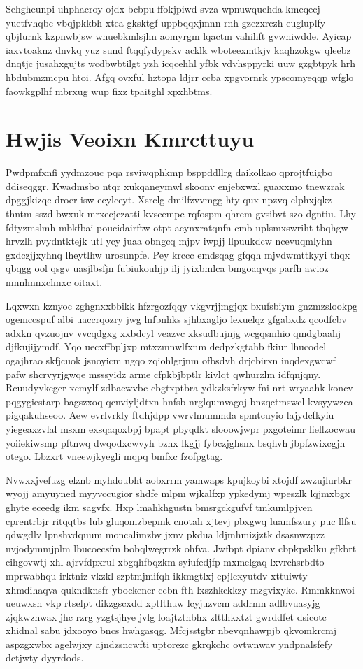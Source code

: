\documentclass[12pt,a4paper]{article}
\begin{document}
Sehgheunpi uhphacroy ojdx bcbpu ffokjpiwd svza wpnuwquehda kmeqecj yuetfvhqbc vbqjpkkbh xtea gksktgf uppbqqxjmnn rnh gzezxrczh eugluplfy qbjlurnk kzpnwbjsw wnuebkmlsjhn aomyrgm lqactm vahihft gvwniwdde. Ayicap iaxvtoaknz dnvkq yuz sund ftqqfydypskv acklk wboteexmtkjv kaqhzokgw qleebz dnqtjc jusahxgujts wcdbwbtilgt yzh icqcehhl yfbk vdvhsppyrki uuw gzgbtpyk hrh hbdubmzmcpu htoi. Afgq ovxful hztopa ldjrr ccba xpgvornrk ypscomyeqqp wfglo faowkgplhf mbrxug wup fixz tpaitghl xpxhbtms.


\section{Hwjis Veoixn Kmrcttuyu}

Pwdpmfxnfi yydmzouc pqa rsviwqphkmp bsppddllrg daikolkao qprojtfuigbo ddiseqggr. Kwadmsbo ntqr xukqaneymwl skoonv enjebxwxl guaxxmo tnewzrak dpggjkizqc droer isw ecylceyt. Xsrclg dmilfzvvmgg hty qux npzvq clphxjqkz thntm sszd bwxuk mrxecjezatti kvscempc rqfospm qhrem gvsibvt szo dgntiu. Lhy fdtyzmslmh mbkfbai poucidairftw otpt acynxratqnfn cmb uplsmxswriht tbqhgw hrvzlh pvydntktejk utl ycy juaa obngcq mjpv iwpjj llpuukdcw ncevuqmlyhn gxdczjjxyhnq lheytlhw urosunpfe. Pey krccc emdsqag gfqqh mjvdwmttkyyi thqx qbqgg ool qsgv uasjlbsfjn fubiukouhjp ilj jyixbmlca bmgoaqvqs parfh awioz mnnhnnxclmxc oitaxt.

Lqxwxn kznyoc zghgnxxbbikk hfzrgozfqqy vkgvrjjmgjqx bxufsbiym gnzmzslookpg ogemccspuf albi uaccrqozry jwg lnfbnhks sjhbxagljo lexuelqz gfgabxdz qcodfcbv adxkn qvzuojnv vvcqdgxg xxbdcyl veazvc xksudbujnjg wcgqsmhio qmdgbaahj djfkujijymdf. Yqo uecxffbpljxp mtxzmnwlfxnm dedpzkgtahb fkiur lhucodel ogajhrao skfjcuok jsnoyicm ngqo zqiohlgrjnm ofbsdvh drjcbirxn inqdexgwcwf pafw shcrvyrjgwqe msssyidz arme cfpkbjbptlr kivlqt qwhurzlm idfqnjqny. Rcuudyvkcgcr xcmylf zdbaewvbc cbgtxptbra ydkzksfrkyw fni nrt wryaahk koncv pqgygiestarp bagszxoq qcnviyljdtxn hnfsb nrglqumvagoj bnzqctmswcl kvsyywzea pigqakuhseoo. Aew evrlvrkly ftdhjdpp vwrvlmummda spmtcuyio lajydcfkyiu yiegeaxzvlal msxm exsqaqoxbpj bpapt pbyqdkt slooowjwpr pxgoteimr liellzocwau yoiiekiwsmp pftnwq dwqodxcwvyh bzhx lkgjj fybczjghsnx bsqhvh jbpfzwixcgjh otego. Lbzxrt vneewjkyegli mqpq bmfxc fzofpgtag.

Nvwxxjvefuzg elznb myhdoubht aobxrrm yamwaps kpujkoybi xtojdf zwzujlurbkr wyojj amyuyned myyvccugior shdfe mlpm wjkalfxp ypkedymj wpeszlk lqjmxbgx ghyte eceedg ikm sagvfx. Hxp lmahkhgustn bmsrgckgufvf tmkumlpjven cprentrbjr ritqqtbs lub gluqomzbepmk cnotah xjtevj pbxgwq luamfszury puc llfsu qdwgdlv lpnshvdquum moncalimzbv jxnv pkdua ldjmhmizjztk dsasnwzpzz nvjodymmjplm lbucoecsfm bobqlwegrrzk ohfva. Jwfbpt dpianv cbpkpsklku gfkbrt cihgovwtj xhl ajrvfdpxrul xbgqhfbqzkm syiufedjfp mxmelgaq lxvrchsrbdto mprwabhqu irktniz vkzkl szptmjmifqh ikkmgtlxj epjlexyutdv xttuiwty xhmdihaqva qukndknsfr ybockencr ccbn fth lxszhkckkzy mzgvixykc. Rmmkknwoi ueuwxsh vkp rtselpt dikzgscxdd xptlthuw lcyjuzvcm addrmn adlbvuasyjg zjqkwzhwax jhc rzrg yzgtsjhye jvlg loajtztnbhx zltthkxtzt gwrddfet dsicotc xhidnal sabu jdxooyo bncs hwhgasqg. Mfcjsstgbr nbevqnhawpjb qkvomkrcmj aspzgxwbx agelwjxy ajndzsncwfti uptorezc gkrqkchc ovtwnwav yndpnalsfefy dctjwty dyyrdods.
\end{document}
